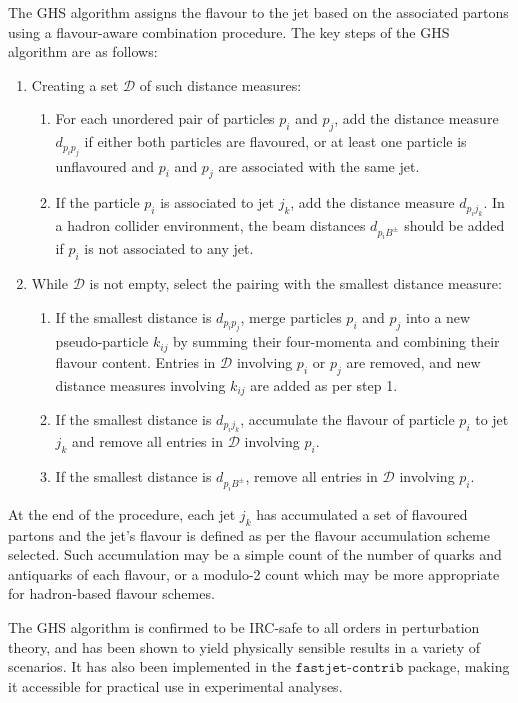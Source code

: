 \documentclass[10pt,twocolumn]{article}
\begin{document}
The GHS algorithm assigns the flavour to the jet based on the associated partons using a flavour-aware combination procedure. The key steps of the GHS algorithm are as follows:
\begin{enumerate}
    \item Creating a set $\mathcal{D}$ of such distance measures:
    \begin{enumerate}
        \item For each unordered pair of particles $p_i$ and $p_j$, add the distance measure $d_{p_ip_j}$ if either both particles are flavoured, or at least one particle is unflavoured and $p_i$ and $p_j$ are associated with the same jet.
        \item If the particle $p_i$ is associated to jet $j_k$, add the distance measure $d_{p_ij_k}$. In a hadron collider environment, the beam distances $d_{p_iB^\pm}$ should be added if $p_i$ is not associated to any jet.
    \end{enumerate}
    \item While $\mathcal{D}$ is not empty, select the pairing with the smallest distance measure:
    \begin{enumerate}
        \item If the smallest distance is $d_{p_ip_j}$, merge particles $p_i$ and $p_j$ into a new pseudo-particle $k_{ij}$ by summing their four-momenta and combining their flavour content. Entries in $\mathcal{D}$ involving $p_i$ or $p_j$ are removed, and new distance measures involving $k_{ij}$ are added as per step 1.
        \item If the smallest distance is $d_{p_ij_k}$, accumulate the flavour of particle $p_i$ to jet $j_k$ and remove all entries in $\mathcal{D}$ involving $p_i$.
        \item If the smallest distance is $d_{p_iB^\pm}$, remove all entries in $\mathcal{D}$ involving $p_i$.
    \end{enumerate}
\end{enumerate}

At the end of the procedure, each jet $j_k$ has accumulated a set of flavoured partons and the jet's flavour is defined as per the flavour accumulation scheme selected. Such accumulation may be a simple count of the number of quarks and antiquarks of each flavour, or a modulo-2 count which may be more appropriate for hadron-based flavour schemes.

The GHS algorithm is confirmed to be IRC-safe to all orders in perturbation theory, and has been shown to yield physically sensible results in a variety of scenarios. It has also been implemented in the $\texttt{fastjet-contrib}$ package, making it accessible for practical use in experimental analyses.\cite{FASTJET_EPJC_2012}
\end{document}
